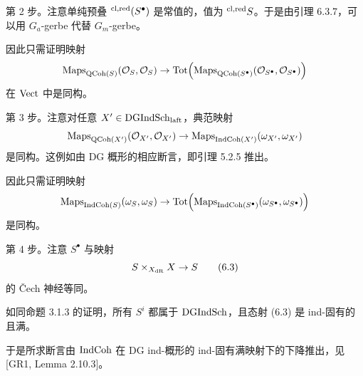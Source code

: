 第 2 步。注意单纯预叠 $^{\mathrm{cl,red}}(S^\bullet)$ 是常值的，值为 $^{\mathrm{cl,red}} S$。于是由引理 6.3.7，可以用 $G_a$-gerbe 代替 $G_m$-gerbe。

因此只需证明映射
\[
\mathrm{Maps}_{\mathrm{QCoh}(S)}(\mathcal{O}_S,\mathcal{O}_S)\to\mathrm{Tot}\Big(\mathrm{Maps}_{\mathrm{QCoh}(S^\bullet)}(\mathcal{O}_{S^\bullet},\mathcal{O}_{S^\bullet})\Big)
\]
在 $\mathrm{Vect}$ 中是同构。

第 3 步。注意对任意 $X'\in\mathrm{DGIndSch}_{\mathrm{laft}}$，典范映射
\[
\mathrm{Maps}_{\mathrm{QCoh}(X')}(\mathcal{O}_{X'},\mathcal{O}_{X'})\to\mathrm{Maps}_{\mathrm{IndCoh}(X')}(\omega_{X'},\omega_{X'})
\]
是同构。这例如由 DG 概形的相应断言，即引理 5.2.5 推出。

因此只需证明映射
\[
\mathrm{Maps}_{\mathrm{IndCoh}(S)}(\omega_S,\omega_S)\to\mathrm{Tot}\Big(\mathrm{Maps}_{\mathrm{IndCoh}(S^\bullet)}(\omega_{S^\bullet},\omega_{S^\bullet})\Big)
\]
是同构。

第 4 步。注意 $S^\bullet$ 与映射
\begin{equation}
S\times_{X_{\mathrm{dR}}}X\to S\tag{6.3}
\end{equation}
的 Čech 神经等同。

如同命题 3.1.3 的证明，所有 $S^i$ 都属于 $\mathrm{DGIndSch}$，且态射 (6.3) 是 ind-固有的且满。

于是所求断言由 $\mathrm{IndCoh}$ 在 DG ind-概形的 ind-固有满映射下的下降推出，见 [GR1, Lemma 2.10.3]。
